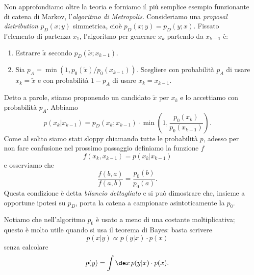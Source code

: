 Non approfondiamo oltre la teoria e forniamo il più semplice esempio
funzionante di catena di Markov, l'\emph{algoritmo di Metropolis}. Consideriamo
una \emph{proposal distribution} $p_D(x;y)$ simmetrica, cioè $p_D(x;y) =
p_D(y;x)$. Fissato l'elemento di partenza $x_1$, l'algoritmo per generare
$x_k$ partendo da $x_{k-1}$ è:
\begin{enumerate}
    \item Estrarre $\tilde x$ secondo $p_D(\tilde x;x_{k-1})$.
    \item Sia $p_A = \min(1, p_0(\tilde x)/p_0(x_{k-1}))$. Scegliere con
    probabilità $p_A$ di usare $x_k = \tilde x$ e con probabilità $1-p_A$
    di usare $x_k = x_{k-1}$.
\end{enumerate}
Detto a parole, stiamo proponendo un candidato $\tilde x$ per $x_k$ e
lo accettiamo con probabilità $p_A$. Abbiamo
\begin{equation}
	p(x_k|x_{k-1})
	= p_D(x_k;x_{k-1}) \cdot \min\left(1,\frac{p_0(x_k)}{p_0(x_{k-1})}\right).
\end{equation}
Come al solito siamo stati sloppy chiamando tutte le probabilità $p$, adesso per
non fare confusione nel prossimo passaggio definiamo la funzione $f$
\begin{equation}
    f(x_k, x_{k-1}) = p(x_k|x_{k-1})
\end{equation}
e osserviamo che
\begin{equation}
    \label{eq:db}
    \frac {f(b, a)} {f(a, b)} = \frac {p_0(b)} {p_0(a)}.
\end{equation}
Questa condizione è detta \emph{bilancio dettagliato} e si può dimostrare che,
insieme a opportune ipotesi su $p_D$, porta la catena a campionare
asintoticamente la $p_0$.

Notiamo che nell'algoritmo $p_0$ è usato a meno di una costante moltiplicativa;
questo è molto utile quando si usa il teorema di Bayes: basta scrivere
\begin{equation*}
	p(x|y) \propto p(y|x) \cdot p(x)
\end{equation*}
senza calcolare
\begin{equation*}
	p(y) = \int \de x\, p(y|x)\cdot p(x).
\end{equation*}

